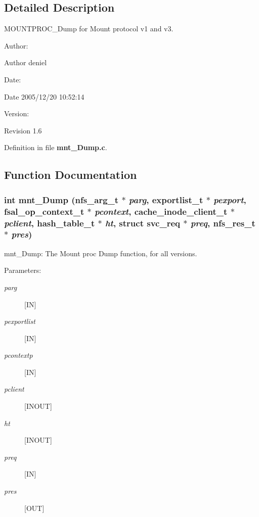 \subsection{Detailed Description}
MOUNTPROC\_\-Dump for Mount protocol v1 and v3. 

\begin{Desc}
\item[Author:]\end{Desc}
\begin{Desc}
\item[Author]deniel \end{Desc}
\begin{Desc}
\item[Date:]\end{Desc}
\begin{Desc}
\item[Date]2005/12/20 10:52:14 \end{Desc}
\begin{Desc}
\item[Version:]\end{Desc}
\begin{Desc}
\item[Revision]1.6 \end{Desc}


Definition in file {\bf mnt\_\-Dump.c}.

\subsection{Function Documentation}
\subsubsection[{mnt\_\-Dump}]{\setlength{\rightskip}{0pt plus 5cm}int mnt\_\-Dump (nfs\_\-arg\_\-t $\ast$ {\em parg}, \/  exportlist\_\-t $\ast$ {\em pexport}, \/  fsal\_\-op\_\-context\_\-t $\ast$ {\em pcontext}, \/  cache\_\-inode\_\-client\_\-t $\ast$ {\em pclient}, \/  hash\_\-table\_\-t $\ast$ {\em ht}, \/  struct svc\_\-req $\ast$ {\em preq}, \/  nfs\_\-res\_\-t $\ast$ {\em pres})}\label{mnt__Dump_8c_aacf4fcb4155bd748b4e869e23d2c0c5}


mnt\_\-Dump: The Mount proc Dump function, for all versions.

\begin{Desc}
\item[Parameters:]
\begin{description}
\item[{\em parg}][IN] \item[{\em pexportlist}][IN] \item[{\em pcontextp}][IN] \item[{\em pclient}][INOUT] \item[{\em ht}][INOUT] \item[{\em preq}][IN] \item[{\em pres}][OUT] \end{description}
\end{Desc}


